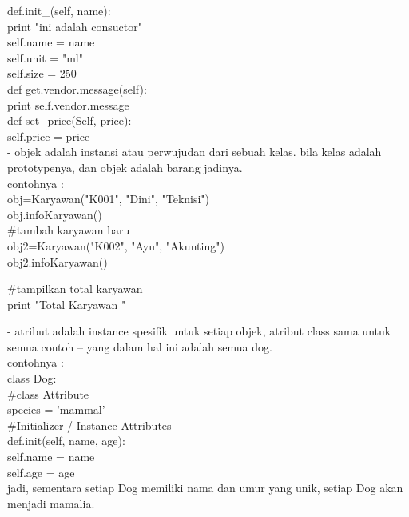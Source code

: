 	def.init\_(self, name):\\
		print "ini adalah consuctor"\\
		self.name = name\\
		self.unit = "ml"\\
		self.size = 250\\
		
	def get.vendor.message(self):\\
		print self.vendor.message\\
		
	def set\_price(Self, price):\\
		self.price = price\\
		
- objek adalah instansi atau perwujudan dari sebuah kelas. bila kelas adalah prototypenya, dan objek adalah barang jadinya.\\
contohnya :\\
obj=Karyawan("K001", "Dini", "Teknisi")\\
obj.infoKaryawan()\\

\#tambah karyawan baru\\
obj2=Karyawan("K002", "Ayu", "Akunting")\\
obj2.infoKaryawan()

\#tampilkan total karyawan\\
print "Total Karyawan " %

- atribut adalah instance spesifik untuk setiap objek, atribut class sama untuk semua contoh -- yang dalam hal ini adalah semua dog.\\
contohnya :\\
class Dog:\\
\#class Attribute\\
	species = 'mammal'\\
\#Initializer / Instance Attributes\\
	def.init(self, name, age):\\
		self.name = name\\
		self.age = age\\
jadi, sementara setiap Dog memiliki nama dan umur yang unik, setiap Dog akan menjadi mamalia.\\

